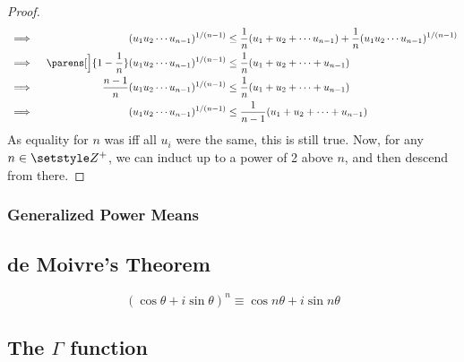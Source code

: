 \begin{proof}
\begin{alignat*}
    &\implies{}& (u_1 u_2 \dotsm u_{n - 1})^{1 / (n - 1)} &\le
            \frac 1n (u_1 + u_2 + \dotsb u_{n - 1}) +
            \frac 1n (u_1 u_2 \dotsm u_{n - 1})^{1 / (n - 1)} \\
    &\implies{}& \parens[\Big]{1 - \frac 1n}
        (u_1 u_2 \dotsm u_{n - 1})^{1 / (n - 1)} &\le
        \frac 1n (u_1 + u_2 + \dotsb + u_{n - 1}) \\
    &\implies{}& \frac {n - 1}n
            (u_1 u_2 \dotsb u_{n - 1})^{1 / (n - 1)} &\le
            \frac 1n (u_1 + u_2 + \dotsb + u_{n - 1}) \\
    &\implies{}& (u_1 u_2 \dotsm u_{n - 1})^{1 / (n - 1)} &\le
            \frac 1{n - 1} (u_1 + u_2 + \dotsb + u_{n - 1})
\end{alignat*}
As equality for \(n\) was iff all \(u_i\) were the same, this is still true.
Now, for any \(n \in \Integers^+\), we can induct up to a power of 2 above
\(n\), and then descend from there.
\end{proof}

\subsubsection{Generalized Power Means}

\subsection{de Moivre's Theorem}

\begin{equation}
(\cos \theta + i \sin \theta)^n \equiv \cos n\theta + i \sin n\theta
\end{equation}

\subsection[The \texorpdfstring{\(\Gamma\)}{Gamma} function]
           {The \boldmath\(\Gamma\) function}


